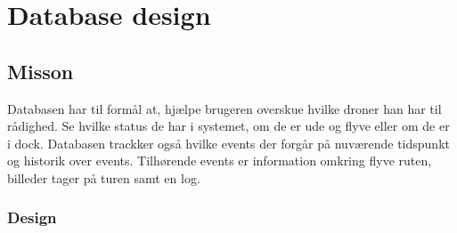 \section{Database design}

\subsection{Misson}
Databasen har til formål at, hjælpe brugeren overskue hvilke droner han har til rådighed. Se hvilke status de har i systemet, om de er ude og flyve eller om de er i dock. Databasen trackker også hvilke events der forgår på nuværende tidspunkt og historik over events. Tilhørende events er information omkring flyve ruten, billeder tager på turen samt en log.

\subsubsection{Design}
